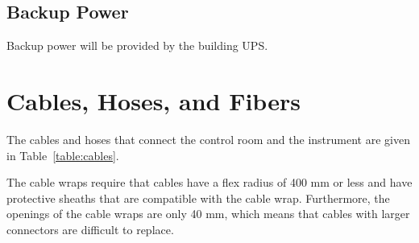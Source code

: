 \documentclass{article}
\newcounter{requirement}
\begin{document}
\subsection{Backup Power}

Backup power will be provided by the building UPS.





\clearpage
\section{Cables, Hoses, and Fibers}

The cables and hoses that connect the control room and the instrument are given in Table~\ref{table:cables}.

The cable wraps require that cables have a flex radius of 400 mm or less and have protective sheaths that are compatible with the cable wrap. Furthermore, the openings of the cable wraps are only 40 mm, which means that cables with larger connectors are difficult to replace. 
\end{document}
